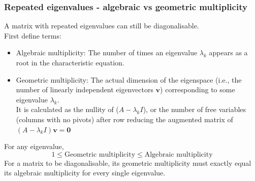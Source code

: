 \documentclass[../linear-algebra.tex]{subfiles}
\begin{document}
\subsubsection{Repeated eigenvalues - algebraic vs geometric multiplicity}
A matrix with repeated eigenvalues can still be diagonalisable.\\
First define terms:
\begin{itemize}
    \item Algebraic multiplicity: The number of times an eigenvalue $\lambda_k$ appears as a root in the characteristic equation.
    \item Geometric multiplicity: The actual dimension of the eigenspace (i.e., the number of linearly independent eigenvectors $\mathbf{v}$) corresponding to some eigenvalue $\lambda_k$.\\
    It is calculated as the nullity of ($A - \lambda_k I$), or the number of free variables (columns with no pivots) after row reducing the augmented matrix of $(A - \lambda_k I) \mathbf{v} = \mathbf{0}$
\end{itemize}
For any eigenvalue, 
$$1 \leq \text{Geometric multiplicity} \leq \text{Algebraic multiplicity}$$
For a matrix to be diagonalisable, its geometric multiplicity must exactly equal its algebraic multiplicity for every single eigenvalue.
\end{document}
